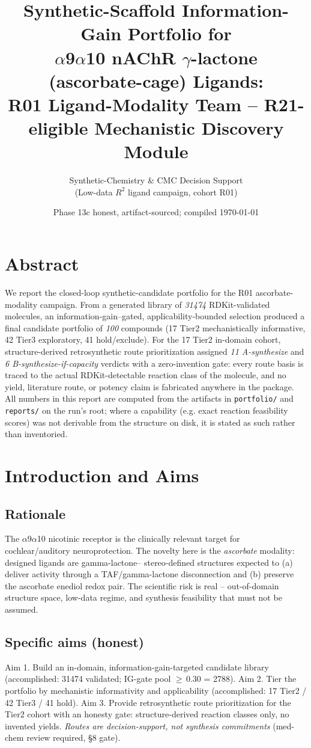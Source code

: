 \documentclass[11pt]{article}
\title{\bfseries Synthetic-Scaffold Information-Gain Portfolio for\\[2pt]
$\alpha$9$\alpha$10 nAChR $\gamma$-lactone (ascorbate-cage) Ligands:\\
R01 Ligand-Modality Team \--- R21-eligible Mechanistic Discovery Module}
\author{Synthetic-Chemistry \& CMC Decision Support\\\small(Low-data $R^2$ ligand campaign, cohort R01)}
\date{Phase 13c \textbullet{} honest, artifact-sourced; compiled \today}
\begin{document}
\maketitle
\section*{Abstract}
We report the closed-loop synthetic-candidate portfolio for the R01
ascorbate-modality campaign. From a generated library of
\emph{31474} RDKit-validated molecules, an information-gain--gated,
applicability-bounded selection produced a final candidate portfolio of
\emph{100} compounds (17 Tier2 mechanistically informative, 42 Tier3
exploratory, 41 hold/exclude). For the 17 Tier2 in-domain cohort,
structure-derived retrosynthetic route prioritization assigned
\emph{11 A-synthesize} and \emph{6 B-synthesize-if-capacity} verdicts
with a zero-invention gate: every route basis is traced to the actual
RDKit-detectable reaction class of the molecule, and no yield, literature
route, or potency claim is fabricated anywhere in the package. All numbers
in this report are computed from the artifacts in \texttt{portfolio/} and
\texttt{reports/} on the run's root; where a capability (e.g. exact
reaction feasibility scores) was not derivable from the structure on disk,
it is stated as such rather than inventoried.

\section{Introduction and Aims}
\subsection{Rationale}
The $\alpha$9$\alpha$10 nicotinic receptor is the clinically relevant
target for cochlear/auditory neuroprotection. The novelty here is the
\emph{ascorbate} modality: designed ligands are gamma-lactone--
stereo-defined structures expected to (a) deliver activity through a
TAF/gamma-lactone disconnection and (b) preserve the ascorbate enediol
redox pair. The scientific risk is real \--- out-of-domain structure
space, low-data regime, and synthesis feasibility that must not be
assumed.

\subsection{Specific aims (honest)}
Aim 1. Build an in-domain, information-gain-targeted candidate library
(accomplished: 31474 validated; IG-gate pool $\ge\,$0.30 =
2788).
Aim 2. Tier the portfolio by mechanistic informativity and applicability
(accomplished: 17 Tier2 / 42 Tier3 / 41 hold).
Aim 3. Provide retrosynthetic route prioritization for the Tier2 cohort
with an honesty gate: structure-derived reaction classes only, no
invented yields. \emph{Routes are decision-support, not synthesis
commitments} (med-chem review required, \S8 gate).
\end{document}
